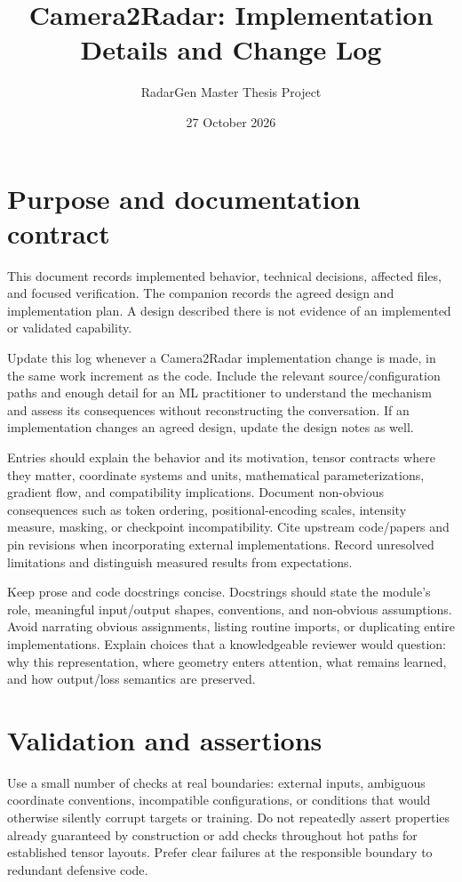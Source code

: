 \documentclass[11pt,a4paper]{article}
\title{Camera2Radar: Implementation Details and Change Log}
\author{RadarGen Master Thesis Project}
\date{27 October 2026}
\begin{document}
\maketitle

\section{Purpose and documentation contract}
This document records implemented behavior, technical decisions, affected files, and focused verification. The companion  records the agreed design and implementation plan. A design described there is not evidence of an implemented or validated capability.

Update this log whenever a Camera2Radar implementation change is made, in the same work increment as the code. Include the relevant source/configuration paths and enough detail for an ML practitioner to understand the mechanism and assess its consequences without reconstructing the conversation. If an implementation changes an agreed design, update the design notes as well.

Entries should explain the behavior and its motivation, tensor contracts where they matter, coordinate systems and units, mathematical parameterizations, gradient flow, and compatibility implications. Document non-obvious consequences such as token ordering, positional-encoding scales, intensity measure, masking, or checkpoint incompatibility. Cite upstream code/papers and pin revisions when incorporating external implementations. Record unresolved limitations and distinguish measured results from expectations.

Keep prose and code docstrings concise. Docstrings should state the module's role, meaningful input/output shapes, conventions, and non-obvious assumptions. Avoid narrating obvious assignments, listing routine imports, or duplicating entire implementations. Explain choices that a knowledgeable reviewer would question: why this representation, where geometry enters attention, what remains learned, and how output/loss semantics are preserved.

\section{Validation and assertions}
Use a small number of checks at real boundaries: external inputs, ambiguous coordinate conventions, incompatible configurations, or conditions that would otherwise silently corrupt targets or training. Do not repeatedly assert properties already guaranteed by construction or add checks throughout hot paths for established tensor layouts. Prefer clear failures at the responsible boundary to redundant defensive code.
\end{document}
